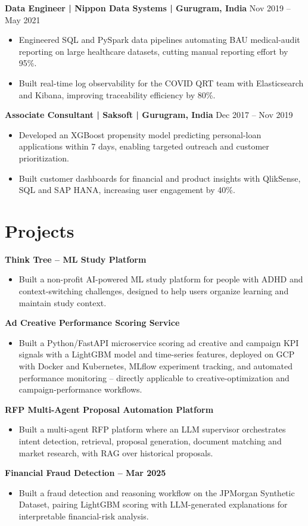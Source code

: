 \documentclass[10pt,a4paper]{article}
\newcommand{\role}[2]{\textbf{#1} \hfill #2\par}
\begin{document}
\role{Data Engineer | Nippon Data Systems | Gurugram, India}{Nov 2019 -- May 2021}
\begin{itemize}
  \item Engineered SQL and PySpark data pipelines automating BAU medical-audit reporting on large healthcare
  datasets, cutting manual reporting effort by 95\%.
  \item Built real-time log observability for the COVID QRT team with Elasticsearch and Kibana, improving
  traceability efficiency by 80\%.
\end{itemize}
\vspace{3pt}

\role{Associate Consultant | Saksoft | Gurugram, India}{Dec 2017 -- Nov 2019}
\begin{itemize}
  \item Developed an XGBoost propensity model predicting personal-loan applications within 7 days, enabling
  targeted outreach and customer prioritization.
  \item Built customer dashboards for financial and product insights with QlikSense, SQL and SAP HANA, increasing
  user engagement by 40\%.
\end{itemize}

\section{Projects}
\textbf{Think Tree -- ML Study Platform}\par
\begin{itemize}
  \item Built a non-profit AI-powered ML study platform for people with ADHD and context-switching challenges,
  designed to help users organize learning and maintain study context.
\end{itemize}
\textbf{Ad Creative Performance Scoring Service}\par
\begin{itemize}
  \item Built a Python/FastAPI microservice scoring ad creative and campaign KPI signals with a LightGBM model and
  time-series features, deployed on GCP with Docker and Kubernetes, MLflow experiment tracking, and automated
  performance monitoring -- directly applicable to creative-optimization and campaign-performance workflows.
\end{itemize}
\textbf{RFP Multi-Agent Proposal Automation Platform}\par
\begin{itemize}
  \item Built a multi-agent RFP platform where an LLM supervisor orchestrates intent detection, retrieval,
  proposal generation, document matching and market research, with RAG over historical proposals.
\end{itemize}
\textbf{Financial Fraud Detection -- Mar 2025}\par
\begin{itemize}
  \item Built a fraud detection and reasoning workflow on the JPMorgan Synthetic Dataset, pairing LightGBM scoring
  with LLM-generated explanations for interpretable financial-risk analysis.
\end{itemize}
\end{document}
